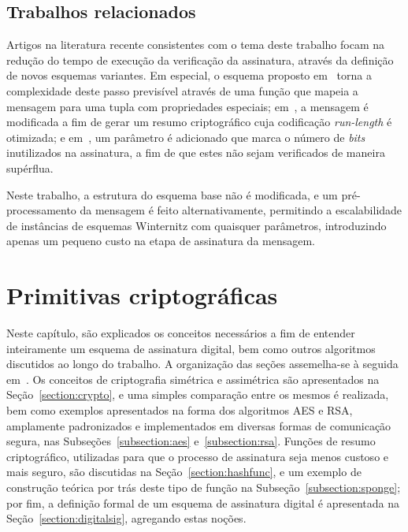 \documentclass{ufsctex/ufsctex}
\begin{document}
\section{Trabalhos relacionados}\label{section:related}

Artigos na literatura recente consistentes com o tema deste trabalho focam na
redução do tempo de execução da verificação da assinatura, através da definição
de novos esquemas variantes. Em especial, o esquema proposto
em~\cite{cruz2016constant} torna a complexidade deste passo previsível através
de uma função que mapeia a mensagem para uma tupla com propriedades especiais;
em~\cite{Steinwandt2008}, a mensagem é modificada a fim de gerar um resumo
criptográfico cuja codificação \emph{run-length} é otimizada; e
em~\cite{mcgrew-hash-sigs-11}, um parâmetro é adicionado que marca o número de
\emph{bits} inutilizados na assinatura, a fim de que estes não sejam
verificados de maneira supérflua.

Neste trabalho, a estrutura do esquema base não é modificada, e um
pré-processamento da mensagem é feito alternativamente, permitindo a
escalabilidade de instâncias de esquemas Winternitz com quaisquer parâmetros,
introduzindo apenas um pequeno custo na etapa de assinatura da mensagem.

\chapter{Primitivas criptográficas}\label{chapter:primitives}

Neste capítulo, são explicados os conceitos necessários a fim de entender
inteiramente um esquema de assinatura digital, bem como outros algoritmos
discutidos ao longo do trabalho. A organização das seções assemelha-se à
seguida em~\cite{Gathen:2015:CRY:2857293}. Os conceitos de criptografia
simétrica e assimétrica são apresentados na Seção~\ref{section:crypto}, e uma
simples comparação entre os mesmos é realizada, bem como exemplos apresentados
na forma dos algoritmos AES e RSA, amplamente padronizados e implementados em
diversas formas de comunicação segura, nas Subseções~\ref{subsection:aes}
e~\ref{subsection:rsa}. Funções de resumo criptográfico, utilizadas para que o
processo de assinatura seja menos custoso e mais seguro, são discutidas na
Seção~\ref{section:hashfunc}, e um exemplo de construção teórica por trás deste
tipo de função na Subseção~\ref{subsection:sponge}; por fim, a definição formal
de um esquema de assinatura digital é apresentada na
Seção~\ref{section:digitalsig}, agregando estas noções.
\end{document}
